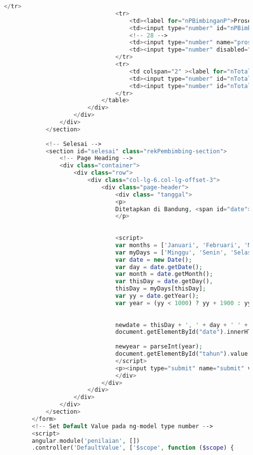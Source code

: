 \begin{lstlisting}[language=PHP,basicstyle=\tiny,caption=skripsi.php]
								</tr>
								<tr>
									<td><label for="nPBimbinganP">Proses Bimbingan</label></td>
									<td><input type="number" id="nPBimbinganP" max="100" ng-model="nilai_PBimbinganP" class="form-nilai"/></td>
									<!-- 28 -->
									<td><input type="number" name="prosesBimbinganPembimbing" ng-model="PBimbinganP.value" ng-init="PBimbinganP.value = 30" min="0" max="100" class="form-nilai" readonly="readonly" /></td>
									<td><input type="number" disabled="disabled" value="{{nilai_PBimbinganP * PBimbinganP.value / 100}}" ng-model="total_PBimbinganP" class="form-nilai"/></td>
								</tr>
								<tr>
									<td colspan="2" ><label for="nTotalBobotP">Total</label></td>
									<td><input type="number" id="nTotalBobotP" max="100" disabled="disabled" value={{TTLaporanP.value+KMateriP.value+PMateriP.value+PBimbinganP.value}} class="form-nilai"/></td>
									<td><input type="number" id="nTotalPembimbing" ng-model="nTotalPembimbing" max="100"  value= "{{nilai_TTLaporanP * TTLaporanP.value / 100 + nilai_KMateriP * KMateriP.value / 100 + nilai_PMateriP * PMateriP.value / 100 + nilai_PBimbinganP * PBimbinganP.value / 100}}" class="form-nilai" disabled="disabled" /></td>
								</tr>
							</table>
						</div>
					</div>
				</div>
			</section>
			
			<!-- Selesai -->
			<section id="selesai" class="rekPembimbing-section">
				<!-- Page Heading -->
				<div class="container">
					<div class="row">
						<div class="col-lg-6.col-lg-offset-3">
							<div class="page-header">
								<div class= "tanggal">
								<p>
								Ditetapkan di Bandung, <span id="date"></span>
								</p>
								
								
								<script>
								var months = ['Januari', 'Februari', 'Maret', 'April', 'Mei', 'Juni', 'Juli', 'Agustus', 'September', 'Oktober', 'November', 'Desember'];
								var myDays = ['Minggu', 'Senin', 'Selasa', 'Rabu', 'Kamis', 'Jum&#39;at', 'Sabtu'];
								var date = new Date();
								var day = date.getDate();
								var month = date.getMonth();
								var thisDay = date.getDay(),
								thisDay = myDays[thisDay];
								var yy = date.getYear();
								var year = (yy < 1000) ? yy + 1900 : yy;
								
								
								newdate = thisDay + ', ' + day + ' ' + months[month] + ' ' + year;
								document.getElementById("date").innerHTML = newdate;
								
								newyear = parseInt(year);
								document.getElementById("tahun").value = newyear;
								</script>
								<p><input type="submit" name="submit" value="Selesai"></p>
								</div>
							</div>
						</div>
					</div>
				</div>
			</section>	
		</form>
		<!-- Set Default Value pada ng-model type number -->
		<script>
		angular.module('penilaian', [])
		.controller('DefaultValue', ['$scope', function ($scope) {
		

\end{lstlisting}
